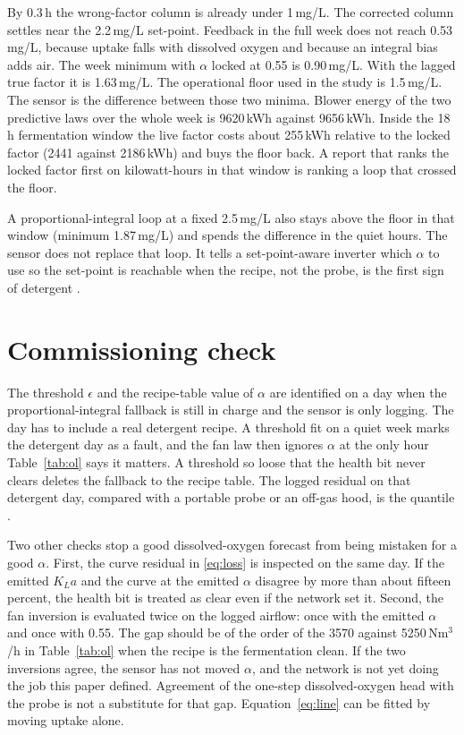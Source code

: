 \documentclass[11pt,a4paper]{article}
\begin{document}
By 0.3\,h the wrong-factor column is already under 1\,mg/L. The corrected column settles near the 2.2\,mg/L set-point. Feedback in the full week does not reach 0.53\,mg/L, because uptake falls with dissolved oxygen and because an integral bias adds air. The week minimum with \(\alpha\) locked at 0.55 is 0.90\,mg/L. With the lagged true factor it is 1.63\,mg/L. The operational floor used in the study is 1.5\,mg/L. The sensor is the difference between those two minima. Blower energy of the two predictive laws over the whole week is 9620\,kWh against 9656\,kWh. Inside the 18\,h fermentation window the live factor costs about 255\,kWh relative to the locked factor (2441 against 2186\,kWh) and buys the floor back. A report that ranks the locked factor first on kilowatt-hours in that window is ranking a loop that crossed the floor.

A proportional-integral loop at a fixed 2.5\,mg/L also stays above the floor in that window (minimum 1.87\,mg/L) and spends the difference in the quiet hours. The sensor does not replace that loop. It tells a set-point-aware inverter which \(\alpha\) to use so the set-point is reachable when the recipe, not the probe, is the first sign of detergent \cite{amand2013,rieger2014}.

\section{Commissioning check}

The threshold \(\epsilon\) and the recipe-table value of \(\alpha\) are identified on a day when the proportional-integral fallback is still in charge and the sensor is only logging. The day has to include a real detergent recipe. A threshold fit on a quiet week marks the detergent day as a fault, and the fan law then ignores \(\alpha\) at the only hour Table~\ref{tab:ol} says it matters. A threshold so loose that the health bit never clears deletes the fallback to the recipe table. The logged residual on that detergent day, compared with a portable probe or an off-gas hood, is the quantile \cite{leu2009,redmon1983}.

Two other checks stop a good dissolved-oxygen forecast from being mistaken for a good \(\alpha\). First, the curve residual in \eqref{eq:loss} is inspected on the same day. If the emitted \(K_La\) and the curve at the emitted \(\alpha\) disagree by more than about fifteen percent, the health bit is treated as clear even if the network set it. Second, the fan inversion is evaluated twice on the logged airflow: once with the emitted \(\alpha\) and once with 0.55. The gap should be of the order of the 3570 against 5250\,Nm\(^{3}\)/h in Table~\ref{tab:ol} when the recipe is the fermentation clean. If the two inversions agree, the sensor has not moved \(\alpha\), and the network is not yet doing the job this paper defined. Agreement of the one-step dissolved-oxygen head with the probe is not a substitute for that gap. Equation~\eqref{eq:line} can be fitted by moving uptake alone.
\end{document}
